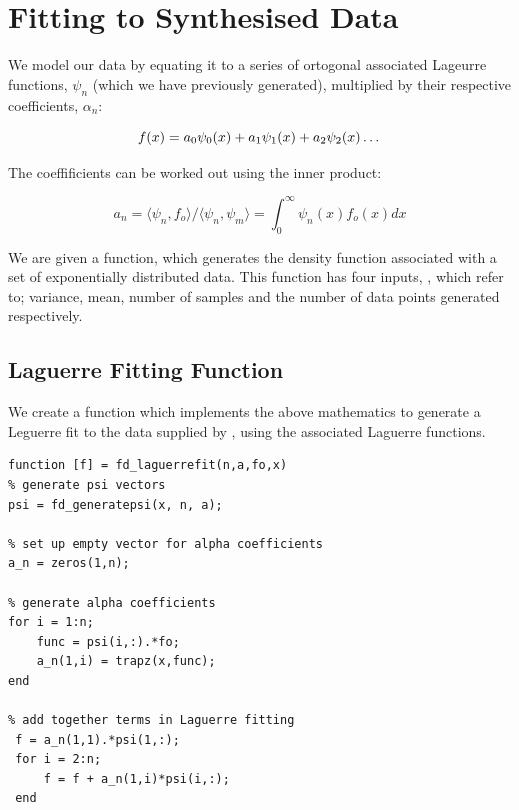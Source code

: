 \documentclass{article}
\begin{document}
\section{Fitting to Synthesised Data}

We model our data by equating it to a series of ortogonal associated Lageurre functions, $\psi_n$ (which we have previously generated), multiplied by their respective coefficients, $\alpha_n$:

$$
f(x) = a_0\psi_0(x) + a_1\psi_1(x) + a_2\psi_2(x)\ldots\\
$$

The coeffificients can be worked out using the inner product:

$$
a_n = \langle \psi_n,f_o\rangle/\langle \psi_n,\psi_m\rangle = \int_{0}^{\infty} \psi_n(x)f_o(x)dx 
$$



We are given a function,  which generates the density function associated with a set of exponentially distributed data. This function has four inputs, , which refer to; variance, mean, number of samples and the number of data points generated respectively. 






















\subsection{Laguerre Fitting Function}

We create a function  which implements the above mathematics to generate a Leguerre fit to the data supplied by , using the associated Laguerre functions. 

\begin{lstlisting}
function [f] = fd_laguerrefit(n,a,fo,x)
% generate psi vectors
psi = fd_generatepsi(x, n, a);      

% set up empty vector for alpha coefficients
a_n = zeros(1,n);

% generate alpha coefficients
for i = 1:n;
    func = psi(i,:).*fo;
    a_n(1,i) = trapz(x,func);
end

% add together terms in Laguerre fitting
 f = a_n(1,1).*psi(1,:);
 for i = 2:n;
     f = f + a_n(1,i)*psi(i,:);
 end
\end{lstlisting}
\end{document}
